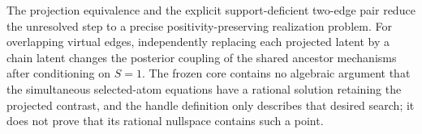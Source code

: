 The projection equivalence and the explicit support-deficient two-edge pair reduce the unresolved step to a precise positivity-preserving realization problem.  For overlapping virtual edges, independently replacing each projected latent by a chain latent changes the posterior coupling of the shared ancestor mechanisms after conditioning on \(S=1\).  The frozen core contains no algebraic argument that the simultaneous selected-atom equations have a rational solution retaining the projected contrast, and the handle definition only describes that desired search; it does not prove that its rational nullspace contains such a point.